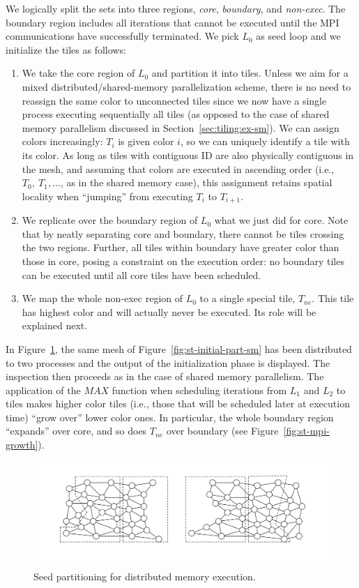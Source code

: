 We logically split the sets into three regions, \textit{core}, \textit{boundary}, and \textit{non-exec}. The boundary region includes all iterations that cannot be executed until the MPI communications have successfully terminated. We pick $L_0$ as seed loop and we initialize the tiles as follows:
\begin{enumerate}
\item We take the core region of $L_0$ and partition it into tiles. Unless we aim for a mixed distributed/shared-memory parallelization scheme, there is no need to reassign the same color to unconnected tiles since we now have a single process executing sequentially all tiles (as opposed to the case of shared memory parallelism discussed in Section~\ref{sec:tiling:ex-sm}). We can assign colors increasingly: $T_i$ is given color $i$, so we can uniquely identify a tile with its color. As long as tiles with contiguous ID are also physically contiguous in the mesh, and assuming that colors are executed in ascending order (i.e., $T_0,\ T_1, ...$, as in the shared memory case), this assignment retains spatial locality when ``jumping'' from executing $T_i$ to $T_{i+1}$.
\item We replicate over the boundary region of $L_0$ what we just did for core. Note that by neatly separating core and boundary, there cannot be tiles crossing the two regions. Further, all tiles within boundary have greater color than those in core, posing a constraint on the execution order: no boundary tiles can be executed until all core tiles have been scheduled.
\item We map the whole non-exec region of $L_0$ to a single special tile, $T_{ne}$. This tile has highest color and will actually never be executed. Its role will be explained next.
\end{enumerate}

In Figure~\ref{fig:st-mpi-init}, the same mesh of Figure~\ref{fig:st-initial-part-sm} has been distributed to two processes and the output of the initialization phase is displayed. The inspection then proceeds as in the case of shared memory parallelism. The application of the $MAX$ function when scheduling iterations from $L_1$ and $L_2$ to tiles makes higher color tiles (i.e., those that will be scheduled later at execution time) ``grow over'' lower color ones. In particular, the whole boundary region ``expands'' over core, and so does $T_{ne}$ over boundary (see Figure~\ref{fig:st-mpi-growth}). 

\begin{figure}[h]
\centering
\includegraphics[width=\textwidth]{sparsetiling/figures/base_mesh_doppio.pdf}
\caption{Seed partitioning for distributed memory execution.}
\label{fig:st-mpi-init}
\end{figure}

